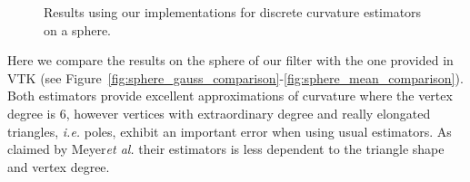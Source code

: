 \documentclass{InsightArticle}
\def \ie {\textit{i.e. }}
\def \etal {\textit{et al. }}
\theoremstyle{plain}
\begin{document}
\begin{figure}[tb]
  \caption{Results using our implementations for discrete curvature estimators on a sphere.} \label{fig:our_sphere_curv}
\end{figure}

Here we compare the results on the sphere of our filter with the one provided in VTK (see Figure~\ref{fig:sphere_gauss_comparison}-\ref{fig:sphere_mean_comparison}). Both estimators provide excellent approximations of curvature where the vertex degree is 6, however vertices with extraordinary degree and really elongated triangles, \ie poles, exhibit an important error when using usual estimators. As claimed by Meyer\etal\cite{Meyer02} their estimators is less dependent to the triangle shape and vertex degree.
\end{document}
